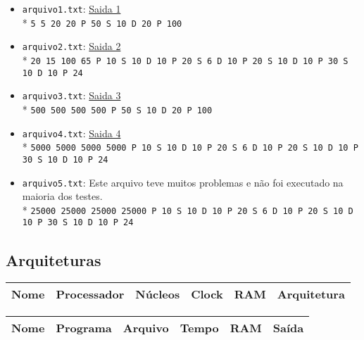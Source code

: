 \documentclass[12pt,a4paper]{article}
\begin{document}
\begin{itemize}
\item \verb+arquivo1.txt+: \href{run:./re1.txt}{Saida 1} \\*
\texttt{5 5 20 20 P 50 S 10 D 20 P 100}
\item \verb+arquivo2.txt+: \href{run:./re2.txt}{Saida 2} \\*
\texttt{20 15 100 65 P 10 S 10 D 10 P 20 S 6 D 10 P 20 S 10 D 10 P 30 S 10 D 10 P 24}
\item \verb+arquivo3.txt+: \href{run:./re3.txt}{Saida 3} \\*
\texttt{500 500 500 500 P 50 S 10 D 20 P 100}
\item \verb+arquivo4.txt+: \href{run:./re4.txt}{Saida 4} \\*
\texttt{5000 5000 5000 5000 P 10 S 10 D 10 P 20 S 6 D 10 P 20 S 10 D 10 P 30 S 10 D 10 P 24}
\item \verb+arquivo5.txt+: Este arquivo teve muitos problemas e não foi executado na maioria dos testes. \\*
\texttt{25000 25000 25000 25000 P 10 S 10 D 10 P 20 S 6 D 10 P 20 S 10 D 10 P 30 S 10 D 10 P 24}
\end{itemize}

\subsection{Arquiteturas}

\begin{table}
\begin{tabular}{|l|l|l|l|l|l|}
  \hline
  \textbf{Nome} & \textbf{Processador} & \textbf{Núcleos} & \textbf{Clock} & \textbf{RAM} & \textbf{Arquitetura} \\
  \hline
  
  
\end{tabular}
\end{table}

\pagebreak

\begin{table}
\begin{tabular}{|l|l|l|l|l|l|}
  \hline
  \textbf{Nome} & \textbf{Programa} & \textbf{Arquivo} & \textbf{Tempo} & \textbf{RAM} & \textbf{Saída} \\
  \hline
  
  
\end{tabular}
\end{table}
\end{document}
